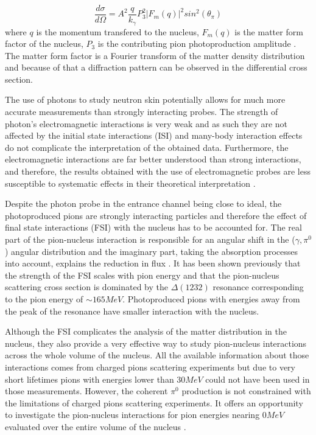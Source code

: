 \begin{equation}
\frac{d\sigma}{d\Omega}=A^{2} \frac{q}{k_{\gamma}} P^{2}_{3} |F_{m}(q)|^{2} sin^{2}(\theta_{\pi})
\end{equation}
where $q$ is the momentum transfered to the nucleus, $F_{m}(q)$ is the matter form factor of the nucleus, $P_{3}$ is the contributing pion photoproduction amplitude \cite{Proposal}. The matter form factor is a Fourier transform of the matter density distribution and because of that a diffraction pattern can be observed in the differential cross section.

\indent The use of photons to study neutron skin potentially allows for much more accurate measurements than strongly interacting probes. The strength of photon's electromagnetic interactions is very weak and as such they are not affected by the initial state interactions (ISI) and many-body interaction effects do not complicate the interpretation of the obtained data. Furthermore, the electromagnetic interactions are far better understood than strong interactions, and therefore, the results obtained with the use of electromagnetic probes are less susceptible to systematic effects in their theoretical interpretation \cite{claire}.

\indent Despite the photon probe in the entrance channel being close to ideal, the photoproduced pions are strongly interacting particles and therefore the effect of final state interactions (FSI) with the nucleus has to be accounted for. The real part of the pion-nucleus interaction is responsible for an angular shift in the ($\gamma,\pi^{0}$) angular distribution and the imaginary part, taking the absorption processes into account, explains the reduction in flux \cite{Proposal}. It has been shown previously that the strength of the FSI scales with pion energy and that the pion-nucleus scattering cross section is dominated by the $\Delta(1232)$ resonance corresponding to the pion energy of $\sim165MeV$. Photoproduced pions with energies away from the peak of the resonance have smaller interaction with the nucleus. 

\indent Although the FSI complicates the analysis of the matter distribution in the nucleus, they also provide a very effective way to study pion-nucleus interactions across the whole volume of the nucleus. All the available information about those interactions comes from charged pions scattering experiments but due to very short lifetimes pions with energies lower than $30MeV$ could not have been used in those measurements. However, the coherent $\pi^{0}$ production is not constrained with the limitations of charged pions scattering experiments. It offers an opportunity to investigate the pion-nucleus interactions for pion energies nearing $0MeV$ evaluated over the entire volume of the nucleus \cite{claire}.

